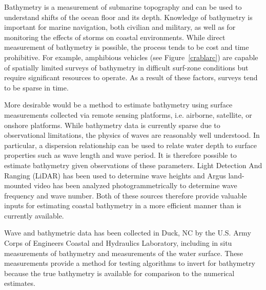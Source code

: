 Bathymetry is a measurement of submarine topography and can be used to understand shifts of the ocean floor and its depth. Knowledge of bathymetry is important for marine navigation, both civilian and military, as well as for monitoring the effects of storms on coastal environments. While direct measurement of bathymetry is possible, the process tends to be cost and time prohibitive. For example, amphibious vehicles (see Figure~\ref{crablarc}) are capable of spatially limited surveys of bathymetry in difficult surf-zone conditions but require significant resources to operate. As a result of these factors, surveys tend to be sparse in time. 


More desirable would be a method to estimate bathymetry using surface measurements collected via remote sensing platforms, i.e. airborne, satellite, or onshore platforms. While bathymetry data is currently sparse due to observational limitations, the physics of waves are reasonably well understood. In particular, a dispersion relationship can be used to relate water depth to surface properties such as wave length and wave period. It is therefore possible to estimate bathymetry given observations of these parameters. Light Detection And Ranging (LiDAR) has been used to determine wave heights and Argus land-mounted video has been analyzed photogrammetrically to determine wave frequency and wave number. Both of these sources therefore provide valuable inputs for estimating coastal bathymetry in a more efficient manner than is currently available.



Wave and bathymetric data has been collected in Duck, NC by the U.S. Army Corps of Engineers Coastal and Hydraulics Laboratory, including in situ measurements of bathymetry and measurements of the water surface. These measurements provide a method for testing algorithms to invert for bathymetry because the true bathymetry is available for comparison to the numerical estimates.
